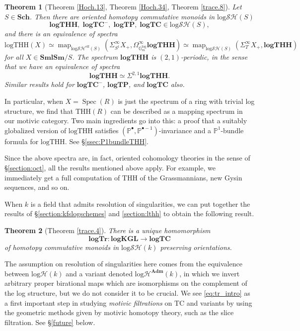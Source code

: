\documentclass[11pt, a4paper]{amsart}
\newtheorem{thm}{Theorem}[subsection]
\theoremstyle{definition}
\numberwithin{equation}{subsection}
\renewcommand{\P}{\mathbb{P}}
\newcommand{\Sch}{\mathbf{Sch}}
\newcommand{\SmlSm}{\mathbf{SmlSm}}
\providecommand{\Spec}[1]{\operatorname{Spec}(#1)} 	%
\newcommand{\Adm}{\mathbf{Adm}}
\newcommand{\THH}{\mathrm{THH}}
\newcommand{\TC}{\mathrm{TC}}
\newcommand{\logKGL}{\mathbf{logKGL}}
\newcommand{\logTHH}{\mathrm{logTHH}}
\newcommand{\spectlogTHH}{\mathbf{logTHH}}
\newcommand{\spectlogTr}{\mathbf{logTr}}
\newcommand{\spectlogTC}{\mathbf{logTC}}
\newcommand{\spectlogTP}{\mathbf{logTP}}
\newcommand{\Gmm}{\mathbb{G}_m^{\mathrm{log}}}
\newcommand{\inflogH}{\mathrm{log}\mathcal{H}}
\newcommand{\inflogSH}{\mathrm{log}\mathcal{SH}}
\newcommand{\inflogSHS}{\mathrm{log}\mathcal{SH}^{\mathrm{eff}}}
\newcommand{\map}{\operatorname{map}}
\begin{document}
\begin{thm}[Theorem \ref{Hoch.13}, Theorem \ref{Hoch.34}, Theorem \ref{trace.8}]
   Let $S\in \Sch$. Then there are \emph{oriented} homotopy commutative monoids in $\inflogSH(S)$
   \[
\spectlogTHH,\; \spectlogTC^-,\; \spectlogTP,\; \spectlogTC
\in
\inflogSH(S),\]
and there is an equivalence of spectra
\[
\logTHH(X)
\simeq
\map_{\inflogSHS(S)}(\Sigma_{S^1}^\infty X_+,\Omega_{\Gmm}^\infty \spectlogTHH)\simeq \map_{\inflogSH(S)}(\Sigma_T^\infty X_+,\spectlogTHH)\]
for all $X\in \SmlSm/S$. The spectrum $\spectlogTHH$ is $(2,1)$-periodic, in the sense that 
we have an equivalence of spectra
\[
\spectlogTHH
\simeq
\Sigma^{2,1}\spectlogTHH.\]
Similar results hold for $\spectlogTC^-$, $\spectlogTP$, and $\spectlogTC$ also.
\end{thm}
In particular, when $X = \Spec{R}$ is just the spectrum of a ring with trivial log structure, we find that $\THH(R)$ can be described as a mapping spectrum in our motivic category.  Two main ingredients go into this: a proof that a suitably globalized version of $\logTHH$ satisfies $(\P^\bullet, \P^{\bullet-1})$-invariance and a $\P^1$-bundle formula for $\logTHH$. See \S \ref{ssec:P1bundleTHH}. 

Since the above spectra are, in fact, oriented cohomology theories in the sense of \S\ref{section:oct}, all the results mentioned above apply. For example, we immediately get a full computation of $\THH$ of the Grassmannians, new Gysin sequences, and so on.

When $k$ is a field that admits resolution of singularities, we can put together the results of \S \ref{section:kfslogschemes} and \ref{section:lthh} to obtain the following result.
\begin{thm}[Theorem \ref{trace.4}]
There is a unique homomorphism
\begin{equation}\label{eq:tr_intro}
\spectlogTr\colon \logKGL \to \spectlogTC
\end{equation}
of homotopy commutative monoids in $\inflogSH(k)$ preserving orientations.  
\end{thm}
The assumption on resolution of singularities here comes from the equivalence between $\inflogH(k)$ and a variant denoted $\inflogH^{\Adm}(k)$, in which we invert arbitrary proper birational maps which are isomorphisms on the complement of the log structure, but we do not consider it to be crucial. 
We see \eqref{eq:tr_intro} as a first important step in studying \emph{motivic filtrations} on $\TC$ and variants by using the geometric methods given by motivic homotopy theory, such as the slice filtration. See \S \ref{future} below. 
\end{document}
